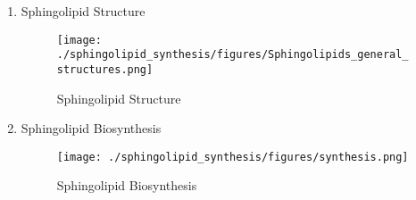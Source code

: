 \documentclass{scrartcl}
\begin{document}
\begin{enumerate}
\item Sphingolipid Structure
\label{sec:org49e220d}

\begin{figure}[htbp]
\centering
\texttt{[image: ./sphingolipid\_synthesis/figures/Sphingolipids\_general\_structures.png]}
\caption[Sphingolipid Structure]{\label{fig:orgb5a1182}
Sphingolipid Structure}
\end{figure}

\item Sphingolipid Biosynthesis
\label{sec:org663649c}

\begin{figure}[htbp]
\centering
\texttt{[image: ./sphingolipid\_synthesis/figures/synthesis.png]}
\caption[Sphingolipid Biosynthesis]{\label{fig:orgd9843c5}
Sphingolipid Biosynthesis}
\end{figure}
\end{enumerate}
\end{document}
